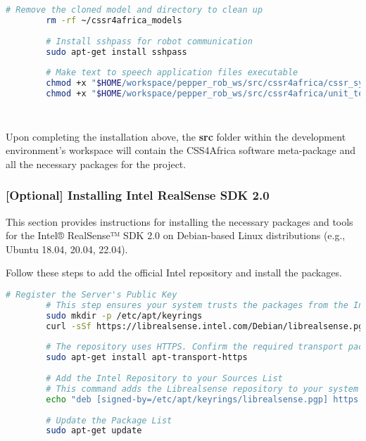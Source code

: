 \documentclass{CSSRforAfrica}
\begin{document}
{\begin{lstlisting}[style=withoutNumbering, language=bash]
		# Remove the cloned model and directory to clean up
		rm -rf ~/cssr4africa_models
		
		# Install sshpass for robot communication
		sudo apt-get install sshpass
		
		# Make text to speech application files executable
		chmod +x "$HOME/workspace/pepper_rob_ws/src/cssr4africa/cssr_system/text_to_speech/src/text_to_speech_application.py"
		chmod +x "$HOME/workspace/pepper_rob_ws/src/cssr4africa/unit_tests/text_to_speech_test/src/text_to_speech_test_application.py"
		
		
		\end{lstlisting}
		
		\noindent Upon completing the installation above, the \textbf{src} folder within the development environment's workspace will contain the CSS4Africa software meta-package and all the necessary packages for the project. 
		
		\subsubsection{[Optional] Installing Intel RealSense SDK 2.0}
		This section provides instructions for installing the necessary packages and tools for the Intel® RealSense™ SDK 2.0 on Debian-based Linux distributions (e.g., Ubuntu 18.04, 20.04, 22.04).
		
		Follow these steps to add the official Intel repository and install the packages.
		
		\begin{lstlisting}[style=withoutNumbering, language=bash]
		# Register the Server's Public Key
		# This step ensures your system trusts the packages from the Intel repository.
		sudo mkdir -p /etc/apt/keyrings
		curl -sSf https://librealsense.intel.com/Debian/librealsense.pgp | sudo tee /etc/apt/keyrings/librealsense.pgp > /dev/null
		
		# The repository uses HTTPS. Confirm the required transport package is installed.
		sudo apt-get install apt-transport-https
		
		# Add the Intel Repository to your Sources List
		# This command adds the Librealsense repository to your system's list of software sources.
		echo "deb [signed-by=/etc/apt/keyrings/librealsense.pgp] https://librealsense.intel.com/Debian/apt-repo `lsb_release -cs` main" | sudo tee /etc/apt/sources.list.d/librealsense.list
		
		# Update the Package List
		sudo apt-get update
		\end{lstlisting}
		
}
\end{document}

